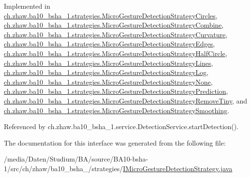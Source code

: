 Implemented in \hyperlink{classch_1_1zhaw_1_1ba10__bsha__1_1_1strategies_1_1MicroGestureDetectionStrategyCircles_a1ce3987ae892eba2d0cf644a111933d3}{ch.zhaw.ba10\_\-bsha\_\-1.strategies.MicroGestureDetectionStrategyCircles}, \hyperlink{classch_1_1zhaw_1_1ba10__bsha__1_1_1strategies_1_1MicroGestureDetectionStrategyCombine_a5487e41dc2d1b6dbe493b5a8420c050f}{ch.zhaw.ba10\_\-bsha\_\-1.strategies.MicroGestureDetectionStrategyCombine}, \hyperlink{classch_1_1zhaw_1_1ba10__bsha__1_1_1strategies_1_1MicroGestureDetectionStrategyCurvature_a939545a8c5597d693f4857a8f6195fc9}{ch.zhaw.ba10\_\-bsha\_\-1.strategies.MicroGestureDetectionStrategyCurvature}, \hyperlink{classch_1_1zhaw_1_1ba10__bsha__1_1_1strategies_1_1MicroGestureDetectionStrategyEdges_a16cd0b9ef604ba14a7eb573a77966c4f}{ch.zhaw.ba10\_\-bsha\_\-1.strategies.MicroGestureDetectionStrategyEdges}, \hyperlink{classch_1_1zhaw_1_1ba10__bsha__1_1_1strategies_1_1MicroGestureDetectionStrategyHalfCircle_a780f7ded471f8e1dbd141518c41c060e}{ch.zhaw.ba10\_\-bsha\_\-1.strategies.MicroGestureDetectionStrategyHalfCircle}, \hyperlink{classch_1_1zhaw_1_1ba10__bsha__1_1_1strategies_1_1MicroGestureDetectionStrategyLines_ac4a6ad22e6ca3b595006c0b956fdd208}{ch.zhaw.ba10\_\-bsha\_\-1.strategies.MicroGestureDetectionStrategyLines}, \hyperlink{classch_1_1zhaw_1_1ba10__bsha__1_1_1strategies_1_1MicroGestureDetectionStrategyLog_a52165ea7fe9595afa64e85b511c3ddbd}{ch.zhaw.ba10\_\-bsha\_\-1.strategies.MicroGestureDetectionStrategyLog}, \hyperlink{classch_1_1zhaw_1_1ba10__bsha__1_1_1strategies_1_1MicroGestureDetectionStrategyNone_affb5fbb496f04e53720496e1cc3feb88}{ch.zhaw.ba10\_\-bsha\_\-1.strategies.MicroGestureDetectionStrategyNone}, \hyperlink{classch_1_1zhaw_1_1ba10__bsha__1_1_1strategies_1_1MicroGestureDetectionStrategyPrediction_af8639be36ae7218b7f7d2feee8edc86f}{ch.zhaw.ba10\_\-bsha\_\-1.strategies.MicroGestureDetectionStrategyPrediction}, \hyperlink{classch_1_1zhaw_1_1ba10__bsha__1_1_1strategies_1_1MicroGestureDetectionStrategyRemoveTiny_a3a51833545b6e87173dbacf505e44359}{ch.zhaw.ba10\_\-bsha\_\-1.strategies.MicroGestureDetectionStrategyRemoveTiny}, and \hyperlink{classch_1_1zhaw_1_1ba10__bsha__1_1_1strategies_1_1MicroGestureDetectionStrategySmoothing_acdb5b6b2bb7ad9f48c79b88770113f45}{ch.zhaw.ba10\_\-bsha\_\-1.strategies.MicroGestureDetectionStrategySmoothing}.

Referenced by ch.zhaw.ba10\_\-bsha\_\-1.service.DetectionService.startDetection().

The documentation for this interface was generated from the following file:\begin{DoxyCompactItemize}
\item 
/media/Daten/Studium/BA/source/BA10-\/bsha-\/1/src/ch/zhaw/ba10\_\-bsha\_/strategies/\hyperlink{IMicroGestureDetectionStrategy_8java}{IMicroGestureDetectionStrategy.java}\end{DoxyCompactItemize}
